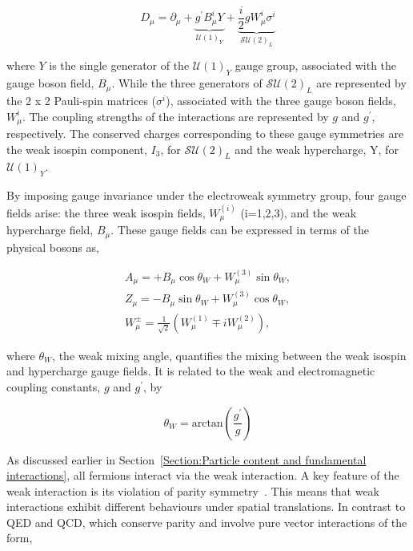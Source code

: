 \begin{equation}
    D_\mu = \partial_\mu + \underbrace{g^{\prime}B^i_\mu Y}_{\mathcal{U}(1)_Y} + \underbrace{\frac{i}{2}gW^i_\mu\sigma^i}_{\mathcal{SU}(2)_L}
\end{equation}

where $Y$ is the single generator of the $\mathcal{U}(1)_Y$ gauge group, associated with the gauge boson field, $B_\mu$. While the three generators of $\mathcal{SU}(2)_L$ are represented by the 2 x 2 Pauli-spin matrices ($\sigma^i$), associated with the three gauge boson fields, $W^i_\mu$. The coupling strengths of the interactions are represented by $g$ and $g^{\prime}$, respectively. The conserved charges corresponding to these gauge symmetries are the weak isospin component, $I_3$, for $\mathcal{SU}(2)_L$ and the weak hypercharge, Y, for $\mathcal{U}(1)_Y$.

By imposing gauge invariance under the electroweak symmetry group, four gauge fields arise: the three weak isospin fields, $W_{\mu}^{(i)}$ (i=1,2,3), and the weak hypercharge field, $B_{\mu}$. These gauge fields can be expressed in terms of the physical bosons as,

\begin{equation}
\begin{array}{c}
A_{\mu} = + B_{\mu} \cos{\theta_{W}} + W_{\mu}^{(3)} \sin{\theta_{W}}, \\
Z_{\mu} = - B_{\mu} \sin{\theta_{W}} + W_{\mu}^{(3)} \cos{\theta_{W}}, \\
W_{\mu}^{\pm} = \frac{1}{\sqrt{2}} (W_{\mu}^{(1)} \mp iW_{\mu}^{(2)}),
\end{array}
\label{Equation:Introduction_PhysicalGaugeFields}
\end{equation}

where $\theta_{W}$, the weak mixing angle, quantifies the mixing between the weak isospin and hypercharge gauge fields. It is related to the weak and electromagnetic coupling constants, $g$ and $g^{\prime}$, by

\begin{equation}
    \theta_W = \text{arctan}(\frac{g^{\prime}}{g})
\end{equation}

As discussed earlier in Section~\ref{Section:Particle content and fundamental interactions}, all fermions interact via the weak interaction. A key feature of the weak interaction is its violation of parity symmetry~\cite{ParityViolation_Wu}. This means that weak interactions exhibit different behaviours under spatial translations. In contrast to QED and QCD, which conserve parity and involve pure vector interactions of the form,

